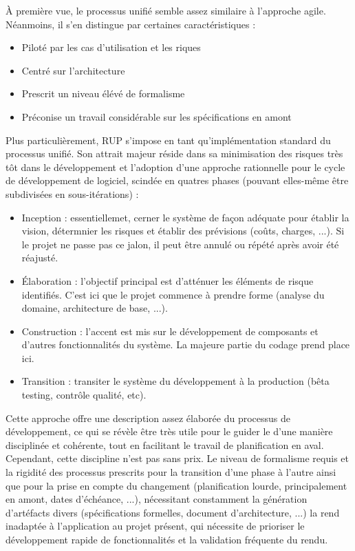 \begin{spacing}{1.5}
À première vue, le processus unifié semble assez similaire à l'approche agile. Néanmoins, il s'en distingue par certaines caractéristiques :
\begin{itemize}
\item Piloté par les cas d'utilisation et les riques
    \item Centré sur l'architecture
    \item Prescrit un niveau élévé de formalisme
    \item Préconise un travail considérable sur les spécifications en amont
\end{itemize}
Plus particulièrement, RUP s'impose en tant qu'implémentation standard du processus unifié. Son attrait majeur réside dans sa minimisation des risques très tôt dans le développement et l'adoption d'une approche rationnelle pour le cycle de développement de logiciel, scindée en quatres phases (pouvant elles-même être subdivisées en sous-itérations) :
\begin{itemize}
    \item Inception : essentiellemet, cerner le système de façon adéquate pour établir la vision, détermnier les risques et établir des prévisions (coûts, charges, ...). Si le projet ne passe pas ce jalon, il peut être annulé ou répété après avoir été réajusté.
    \item Élaboration : l'objectif principal est d'atténuer les éléments de risque identifiés. C'est ici que le projet commence à prendre forme (analyse du domaine, architecture de base, ...).
    \item Construction : l'accent est mis sur le développement de composants et d'autres fonctionnalités du système. La majeure partie du codage prend place ici.
    \item Transition : transiter le système du développement à la production (bêta testing, contrôle qualité, etc).
\end{itemize}
Cette approche offre une description assez élaborée du processus de développement, ce qui se révèle être très utile pour le guider le d'une manière disciplinée et cohérente, tout en facilitant le travail de planification en aval. Cependant, cette discipline n'est pas sans prix. Le niveau de formalisme requis et la rigidité des processus prescrits pour la transition d'une phase à l'autre ainsi que pour la prise en compte du changement (planification lourde, principalement en amont, dates d'échéance, ...), nécessitant constamment la génération d'artéfacts  divers (spécifications formelles, document d'architecture, ...) la rend inadaptée à l'application au projet présent, qui nécessite de prioriser le développement rapide de fonctionnalités et la validation fréquente du rendu.\\


\end{spacing}
